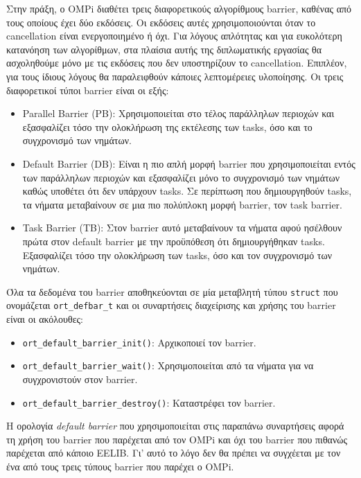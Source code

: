 Στην πράξη, ο OMPi διαθέτει τρεις διαφορετικούς αλγορίθμους barrier, καθένας από τους οποίους έχει δύο εκδόσεις. Οι εκδόσεις αυτές χρησιμοποιούνται όταν το cancellation είναι ενεργοποιημένο ή όχι. Για λόγους απλότητας και για ευκολότερη κατανόηση των αλγορίθμων, στα πλαίσια αυτής της διπλωματικής εργασίας θα ασχοληθούμε μόνο με τις εκδόσεις που δεν υποστηρίζουν το cancellation. Επιπλέον, για τους ίδιους λόγους θα παραλειφθούν κάποιες λεπτομέρειες υλοποίησης. Οι τρεις διαφορετικοί τύποι barrier είναι οι εξής:
\begin{itemize}
	\item Parallel Barrier (PB): Χρησιμοποιείται στο τέλος παράλληλων περιοχών και εξασφαλίζει τόσο την ολοκλήρωση της εκτέλεσης των tasks, όσο και το συγχρονισμό των νημάτων.
	\item Default Barrier (DB): Είναι η πιο απλή μορφή barrier που χρησιμοποιείται εντός των παράλληλων περιοχών και εξασφαλίζει μόνο το συγχρονισμό των νημάτων καθώς υποθέτει ότι δεν υπάρχουν tasks. Σε περίπτωση που δημιουργηθούν tasks, τα νήματα μεταβαίνουν σε μια πιο πολύπλοκη μορφή barrier, τον task barrier. 
	\item Task Barrier (TB): Στον barrier αυτό μεταβαίνουν τα νήματα αφού ησέλθουν πρώτα στον default barrier με την προϋπόθεση ότι δημιουργήθηκαν tasks. Εξασφαλίζει τόσο την ολοκλήρωση των tasks, όσο και τον συγχρονισμό των νημάτων.
\end{itemize}

Όλα τα δεδομένα του barrier αποθηκεύονται σε μία μεταβλητή τύπου \texttt{struct} που ονομάζεται \texttt{ort\_defbar\_t} και οι συναρτήσεις διαχείρισης και χρήσης του barrier είναι οι ακόλουθες:

\begin{itemize}
	\item \texttt{ort\_default\_barrier\_init()}: Αρχικοποιεί τον barrier.
	\item \texttt{ort\_default\_barrier\_wait()}: Χρησιμοποιείται από τα νήματα για να συγχρονιστούν στον barrier.
	\item \texttt{ort\_default\_barrier\_destroy()}: Καταστρέφει τον barrier.
\end{itemize}

Η ορολογία \textit{default barrier} που χρησιμοποιείται στις παραπάνω συναρτήσεις αφορά τη χρήση του barrier που παρέχεται από τον OMPi και όχι του barrier που πιθανώς παρέχεται από κάποιο EELIB. Γι' αυτό το λόγο δεν θα πρέπει να συγχέεται με τον ένα από τους τρεις τύπους barrier που παρέχει ο OMPi.

